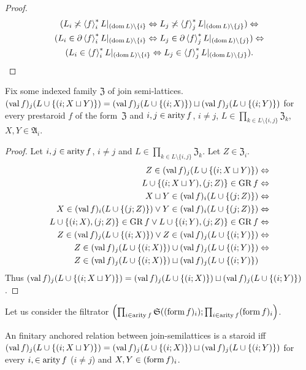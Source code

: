 \begin{proof}
~
\begin{multline*}
(L_{i}\not\asymp\left\langle f\right\rangle ^{\ast}_{i}L|_{(\operatorname{dom} L)\setminus\{i\}}\Leftrightarrow L_{j}\not\asymp\left\langle f\right\rangle ^{\ast}_{j}L|_{(\operatorname{dom} L)\setminus\{j\}})\Leftrightarrow\\
(L_{i}\in\partial\left\langle f\right\rangle ^{\ast}_{i}L|_{(\operatorname{dom} L)\setminus\{i\}}\Leftrightarrow L_{j}\in\partial\left\langle f\right\rangle ^{\ast}_{j}L|_{(\operatorname{dom} L)\setminus\{j\}})\Leftrightarrow\\
(L_{i}\in\left\langle f\right\rangle ^{\ast}_{i}L|_{(\operatorname{dom} L)\setminus\{i\}}\Leftrightarrow L_{j}\in\left\langle f\right\rangle ^{\ast}_{j}L|_{(\operatorname{dom} L)\setminus\{j\}}).
\end{multline*}
\end{proof}
\begin{thm}
Fix some indexed family $\mathfrak{Z}$ of join semi-lattices. $(\operatorname{val} f)_{j}(L\cup\{(i;X\sqcup Y)\})=(\operatorname{val} f)_{j}(L\cup\{(i;X)\})\sqcup(\operatorname{val} f)_{j}(L\cup\{(i;Y)\})$
for every prestaroid $f$ of the form~$\mathfrak{Z}$ and $i,j\in\operatorname{arity} f$,
$i\neq j$, $L\in\prod_{k\in L\setminus\{i,j\}}\mathfrak{Z}_{k}$,
$X,Y\in\mathfrak{A}_{i}$.\end{thm}
\begin{proof}
Let $i,j\in\operatorname{arity} f$, $i\ne j$ and $L\in\prod_{k\in L\setminus\{i,j\}}\mathfrak{Z}_{k}$.
Let $Z\in\mathfrak{Z}_{i}$.
\begin{align*}
Z\in(\operatorname{val} f)_{j}(L\cup\{(i;X\sqcup Y)\}) & \Leftrightarrow\\
L\cup\{(i;X\sqcup Y),(j;Z)\}\in\operatorname{GR} f & \Leftrightarrow\\
X\sqcup Y\in(\operatorname{val} f)_{i}(L\cup\{(j;Z)\}) & \Leftrightarrow\\
X\in(\operatorname{val} f)_{i}(L\cup\{(j;Z)\})\lor Y\in(\operatorname{val} f)_{i}(L\cup\{(j;Z)\}) & \Leftrightarrow\\
L\cup\{(i;X),(j;Z)\}\in\operatorname{GR} f\lor L\cup\{(i;Y),(j;Z)\}\in\operatorname{GR} f & \Leftrightarrow\\
Z\in(\operatorname{val} f)_{j}(L\cup\{(i;X)\})\lor Z\in(\operatorname{val} f)_{j}(L\cup\{(i;Y)\}) & \Leftrightarrow\\
Z\in(\operatorname{val} f)_{j}(L\cup\{(i;X)\})\cup(\operatorname{val} f)_{j}(L\cup\{(i;Y)\}) & \Leftrightarrow\\
Z\in(\operatorname{val} f)_{j}(L\cup\{(i;X)\})\sqcup(\operatorname{val} f)_{j}(L\cup\{(i;Y)\})
\end{align*}
Thus $(\operatorname{val} f)_{j}(L\cup\{(i;X\sqcup Y)\})=(\operatorname{val} f)_{j}(L\cup\{(i;X)\})\sqcup(\operatorname{val} f)_{j}(L\cup\{(i;Y)\})$.
\end{proof}
Let us consider the filtrator $\left(\prod_{i\in\operatorname{arity} f}\mathfrak{S}((\operatorname{form} f)_{i});\prod_{i\in\operatorname{arity} f}(\operatorname{form} f)_{i}\right)$.
\begin{conjecture}
An finitary anchored relation between join-semilattices is a staroid
iff $(\operatorname{val} f)_{j}(L\cup\{(i;X\sqcup Y)\})=(\operatorname{val} f)_{j}(L\cup\{(i;X)\})\sqcup(\operatorname{val} f)_{j}(L\cup\{(i;Y)\})$
for every $i,\in\operatorname{arity} f$ ($i\ne j$) and $X,Y\in(\operatorname{form} f)_{i}$.\end{conjecture}
